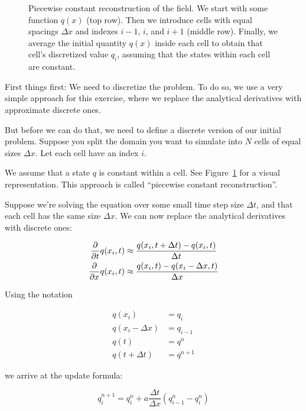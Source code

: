 \begin{figure}[htbp]
	\caption{
		Piecewise constant reconstruction of the field. We start with some function
		$q(x)$ (top row). Then we introduce cells with equal spacings $\Delta x$ and
		indexes $i - 1$, $i$, and $i + 1$ (middle row). Finally, we average the
		initial quantity $q(x)$ inside each cell to obtain that cell's discretized
		value $q_i$, assuming that the states within each cell are constant.
	}
	\label{fig:pwconst}
\end{figure}


First things first: We need to discretize the problem. To do so, we use a very
simple approach for this exercise, where we replace the analytical derivatives
with approximate discrete ones.

But before we can do that, we need to define a discrete version of our initial
problem. Suppose you split the domain you want to simulate into $N$ cells of
equal sizes $\Delta x$. Let each cell have an index $i$.

We assume that a state $q$ is constant within a cell. See Figure~\ref{fig:pwconst}
for a visual representation. This approach is called ``piecewise constant reconstruction''.

Suppose we're solving the equation over some small time step size $\Delta t$, and
that each cell has the same size $\Delta x$. We can now replace the analytical
derivatives with discrete ones:

\begin{align}
	\frac{\partial}{\partial t}{q(x_i, t)} &\approx \frac{q(x_i, t + \Delta t) - q(x_i, t)}{\Delta t} \\
	\frac{\partial}{\partial x}{q(x_i, t)} &\approx \frac{q(x_i, t) - q(x_i - \Delta x, t)}{\Delta x} \label{eq:approx-gradient}
\end{align}

Using the notation

\begin{align}
	q(x_i) &= q_i \\
	q(x_i - \Delta x) &= q_{i-1} \\
	q(t) &= q^n \\
	q(t + \Delta t) &= q^{n + 1}
\end{align}

we arrive at the update formula:

\begin{equation}
\boxed{
	q_i^{n+1} = q_i^{n} +  a \frac{\Delta t}{\Delta x} \left( q_{i-1}^n - q_{i}^n \right)
}
\label{eq:advection-first-order}
\end{equation}



